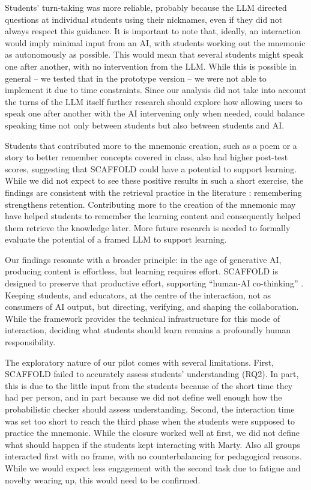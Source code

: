 \documentclass[fleqn,10pt]{wlscirep}
\begin{document}
Students' turn-taking was more reliable, probably because the LLM directed questions at individual students using their nicknames, even if they did not always respect this guidance. It is important to note that, ideally, an interaction would imply minimal input from an AI, with students working out the mnemonic as autonomously as possible. This would mean that several students might speak one after another, with no intervention from the LLM. While this is possible in general -- we tested that in the prototype version -- we were not able to implement it due to time constraints. Since our analysis did not take into account the turns of the LLM itself further research should explore how allowing users to speak one after another with the AI intervening only when needed, could balance speaking time not only between students but also between students and AI.

Students that contributed more to the mnemonic creation, such as a poem or a story to better remember concepts covered in class, also had higher post-test scores, suggesting that SCAFFOLD could have a potential to support learning. While we did not expect to see these positive results in such a short exercise, the findings are consistent with the retrieval practice in the literature \cite{Roediger2011}: remembering strengthens retention. Contributing more to the creation of the mnemonic may have helped students to remember the learning content and consequently helped them retrieve the knowledge later. More future research is needed to formally evaluate the potential of a framed LLM to support learning.

Our findings resonate with a broader principle: in the age of generative AI, producing content is effortless, but learning requires effort. SCAFFOLD is designed to preserve that productive effort, supporting ``human-AI co-thinking'' \cite{BardynForthcoming}. Keeping students, and educators, at the centre of the interaction, not as consumers of AI output, but directing, verifying, and shaping the collaboration. While the framework provides the technical infrastructure for this mode of interaction, deciding what students should learn remains a profoundly human responsibility.

The exploratory nature of our pilot comes with several limitations. First, SCAFFOLD failed to accurately assess students' understanding (RQ2). In part, this is due to the little input from the students because of the short time they had per person, and in part because we did not define well enough how the probabilistic checker should assess understanding. Second, the interaction time was set too short to reach the third phase when the students were supposed to practice the mnemonic. While the closure worked well at first, we did not define what should happen if the students kept interacting with Marty. Also all groups interacted first with no frame, with no counterbalancing for pedagogical reasons. While we would expect less engagement with the second task due to fatigue and novelty wearing up, this would need to be confirmed.
\end{document}
